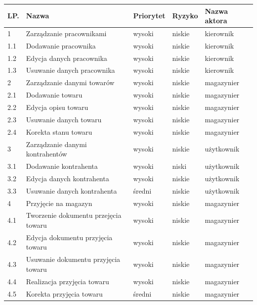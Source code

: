 \begin{table}[ht]
	 \begin{center}
	    \begin{tabular}{| l | l | l | l | l |}%
	    	\hline
		    \textbf{LP.} & \textbf{Nazwa}  & \textbf{Priorytet} & \textbf{Ryzyko} &
		    \textbf{Nazwa aktora} \\
		    \hline
			1 & Zarządzanie pracownikami & wysoki & niskie & kierownik \\
		    1.1 & Dodawanie pracownika & wysoki & niskie & kierownik \\
		    1.2 & Edycja danych pracownika & wysoki & niskie & kierownik \\ 	
		    1.3 & Usuwanie danych pracownika & wysoki &niskie & kierownik \\
		    \hline
		    2 & Zarządzanie danymi towarów & wysoki & niskie & magazynier \\
		    2.1 & Dodawanie towaru & wysoki &  niskie & magazynier \\
		    2.2 & Edycja opisu towaru & wysoki & niskie & magazynier \\
		    2.3 & Usuwanie danych towaru & wysoki & niskie & magazynier \\
            2.4 & Korekta stanu towaru & wysoki & niskie & magazynier \\
		    \hline
		   	3 & Zarządzanie danymi kontrahentów & wysoki & niskie & użytkownik \\
		   	3.1 & Dodawanie kontrahenta & wysoki & niski & użytkownik \\
		   	3.2 & Edycja danych kontrahenta & wysoki & niskie & użytkownik \\
		   	3.3 & Usuwanie danych kontrahenta & średni & niskie & użytkownik \\
		   	\hline
            4 & Przyjęcie na magazyn & wysoki & niskie & magazynier \\
		   	4.1 & Tworzenie dokumentu przejęcia towaru & wysoki & niskie & magazynier \\
		   	4.2 & Edycja dokumentu przyjęcia towaru & wysoki & niskie & magazynier \\
		   	4.3 & Usuwanie dokumentu przyjęcia towaru & wysoki & niskie & magazynier \\
		   	4.4 & Realizacja przyjęcia towaru & wysoki & niskie & magazynier \\
		   	4.5 & Korekta przyjęcia towaru & średni & niskie & magazynier \\
            \hline

\end{tabular}
\end{center}
\end{table}
